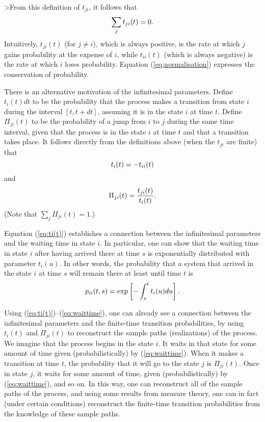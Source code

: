 \documentclass[12pt]{article}
\newcommand{\be}{\vspace*{6pt} \begin{equation}}
\newcommand{\ee}{\vspace*{10pt} \end{equation}}
\begin{document}
>From this definition of $t_{ji}$, it follows that
\be
\sum_j t_{ji}(t)=0.
\label{eq:normalisation}
\ee
Intuitively, $t_{ji}(t)$ (for $j\neq i$), which is always positive, is
the rate at which $j$ gains probability at the expense of $i$, while
$t_{ii}(t)$ (which is always negative) is the rate at which $i$ loses
probability.  Equation (\ref{eq:normalisation}) expresses the
conservation of probability.

There is an alternative motivation of the infinitesimal parameters.
Define $t_{i}(t)dt$ to be the probability that the process makes a
transition from state $i$ during the interval $[t,t+dt]$, assuming it
is in the state $i$ at time $t$.  Define $\Pi_{ji}(t)$ to be the
probability of a jump from $i$ to $j$ during the same time interval,
given that the process is in the state $i$ at time $t$ and that a
transition takes place.  It follows directly from the definitions
above (when the $t_{ji}$ are finite) that
\be
\label{eq:ti(t)}
t_i(t) = -t_{ii}(t)
\ee
and
\be
\label{eq:Piji(t)}
\Pi_{ji}(t) = \frac{t_{ji}(t)}{t_{i}(t)}.
\ee
(Note that $\sum_j\Pi_{ji}(t)=1$.)

Equation (\ref{eq:ti(t)}) establishes a connection between the
infinitesimal parameters and the waiting time in state $i$.  In
particular, one can show that the waiting time in state $i$ after
having arrived there at time $s$ is exponentially distributed with
parameter $t_{i}(u)$.  In other words, the probability that a system
that arrived in the state $i$ at time $s$ will remain there at least
until time $t$ is
\be
\label{eq:waittime}
p_{ii}(t,s) = \exp \left[ { -\int_{s}^{t}t_{i}(u)du } \right].
\ee

Using (\ref{eq:ti(t)})--(\ref{eq:waittime}), one can already see a
connection between the infinitesimal parameters and the finite-time
transition probabilities, by using $t_{i}(t)$ and $\Pi_{ji}(t)$ to
reconstruct the sample paths (realizations) of the process.  We
imagine that the process begins in the state $i$.  It waits in that
state for some amount of time given (probabilistically) by
(\ref{eq:waittime}).  When it makes a transition at time $t$, the
probability that it will go to the state $j$ is $\Pi_{ji}(t)$.  Once
in state $j$, it waits for some amount of time, given
(probabilistically) by (\ref{eq:waittime}), and so on.  In this way,
one can reconstruct all of the sample paths of the process, and using
some results from measure theory, one can in fact (under certain
conditions) reconstruct the finite-time transition probabilities from
the knowledge of these sample paths.
\end{document}
